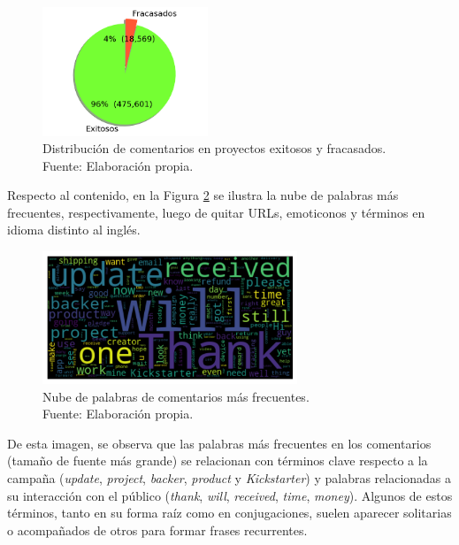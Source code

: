 \begin{figure}[!ht]
	\begin{center}
		\includegraphics[width=0.44\textwidth]{4/figures/total comments by projects state.png}
		\caption[Distribución de comentarios en proyectos exitosos y fracasados]{Distribución de comentarios en proyectos exitosos y fracasados.\\
			Fuente: Elaboración propia.}
		\label{4:fig21}
	\end{center}
\end{figure}

Respecto al contenido, en la Figura \ref{4:fig22} se ilustra la nube de palabras más frecuentes, respectivamente, luego de quitar URLs, emoticonos y términos en idioma distinto al inglés.

\begin{figure}[htbp]
	\begin{center}
		\includegraphics[width=0.68\textwidth]{4/figures/comments_wordcloud_wordunit.png}
		\caption[Nube de palabras de comentarios más frecuentes]{Nube de palabras de comentarios más frecuentes.\\
			Fuente: Elaboración propia.}
		\label{4:fig22}
	\end{center}
\end{figure}

De esta imagen, se observa que las palabras más frecuentes en los comentarios (tamaño de fuente más grande) se relacionan con términos clave respecto a la campaña (\textit{update}, \textit{project}, \textit{backer}, \textit{product} y \textit{Kickstarter}) y palabras relacionadas a su interacción con el público (\textit{thank}, \textit{will}, \textit{received}, \textit{time}, \textit{money}). Algunos de estos términos, tanto en su forma raíz como en conjugaciones, suelen aparecer solitarias o acompañados de otros para formar frases recurrentes.


